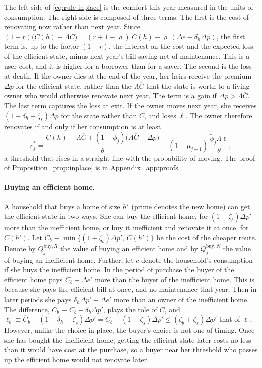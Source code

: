 The left side of \eqref{eq:rule-inplace} is
the comfort this year measured in  the units of consumption. The right side is composed of three
terms. The first is the cost of renovating now rather than next year. Since
$(1+r)\bigl(C(h)-\Lambda\overline C\bigr)
=(r+1-\varrho)\,C(h)-\varrho\,(\Delta e-\delta_h\Delta p)$, the first term is, up to the factor $(1+r)$, the
interest on the cost and the expected loss of the efficient state, minus
next year's bill saving net of maintenance. This is a user cost, and it is
higher for a borrower than for a saver. The second is the loss at death. If
the owner dies at the end of the year, her heirs receive the premium
$\Delta p$ for the efficient state, rather than the $\Lambda\overline C$
that the state is worth to a living owner who would otherwise renovate next
year. The term is a gain if $\Delta p>\Lambda\overline C$. The last term captures the
loss at exit. If the owner moves next year, she
receives $(1-\delta_h-\zeta_s)\Delta p$ for the state rather than
$\overline C$, and loses $\ell$. The owner therefore renovates if and only
if her consumption is at least
\begin{equation}
  c_j^*=\frac{C(h)-\Lambda\overline C+(1-\tilde\phi_j)
  \bigl(\Lambda\overline C-\Delta p\bigr)}{\theta}
  +(1-\mu_{j+1})\,\frac{\tilde\phi_j\Lambda\ell}{\theta},
  \label{eq:cstar-inplace}
\end{equation}
a threshold that rises in a straight line with the probability of moving. The proof of Proposition~\ref{prop:inplace} is in Appendix~\ref{app:proofs}. 



\paragraph{Buying an efficient home.}
A household that buys a home of size $h'$ (prime denotes the new home) can get the efficient state in two
ways. She can buy
the efficient home, for $(1+\zeta_b)\Delta p'$ more than the inefficient
home, or buy it inefficient and renovate it at once, for $C(h')$. Let
$C_b\equiv\min\{(1+\zeta_b)\Delta p',\,C(h')\}$ be the cost of the cheaper
route. Denote by $Q_j^{\mathrm{buy},R}$ the value of buying an efficient home and by
$Q_j^{\mathrm{buy},N}$ the value of buying an inefficient home. Further, let $c$ denote the
household's consumption if she buys the inefficient home. In the period of
purchase the buyer of the efficient home pays $C_b-\Delta e'$ more than the
buyer of the inefficient home. This is because she pays the efficient bill at once, and no
maintenance that year. Then in later periods  she pays
$\delta_h\Delta p'-\Delta e'$ more than an owner of the inefficient home.
The difference, $\overline C_b\equiv C_b-\delta_h\Delta p'$, plays the role
of $\overline C$, and
$\ell_b\equiv\overline C_b-(1-\delta_h-\zeta_s)\Delta p'
=C_b-(1-\zeta_s)\Delta p'\le(\zeta_b+\zeta_s)\Delta p'$ that of $\ell$. However, unlike the choice in place, the buyer's choice is not one
of timing. Once she has bought the inefficient home, getting the efficient
state later costs no less than it would have cost at the purchase, so a buyer
near her threshold who passes up the efficient home would not renovate later.

